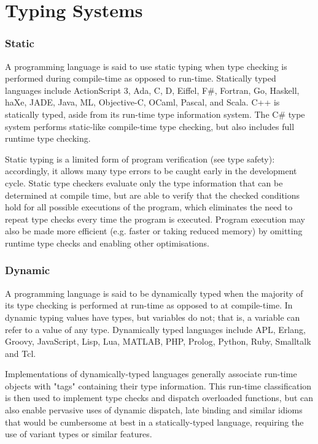 \documentclass[a4paper,oneside]{report}
\begin{document}
	\section{Typing Systems}

		\subsubsection{Static}

		A programming language is said to use static typing when type checking is performed during compile-time as opposed to run-time. Statically typed languages include ActionScript 3, Ada, C, D, Eiffel, F\#, Fortran, Go, Haskell, haXe, JADE, Java, ML, Objective-C, OCaml, Pascal, and Scala. C++ is statically typed, aside from its run-time type information system. The C\# type system performs static-like compile-time type checking, but also includes full runtime type checking. 

		Static typing is a limited form of program verification (see type safety): accordingly, it allows many type errors to be caught early in the development cycle. Static type checkers evaluate only the type information that can be determined at compile time, but are able to verify that the checked conditions hold for all possible executions of the program, which eliminates the need to repeat type checks every time the program is executed. Program execution may also be made more  efficient (e.g. faster or taking reduced memory) by omitting runtime type checks and enabling other optimisations.


		\subsubsection{Dynamic}
		
		A programming language is said to be dynamically typed when the majority of its type checking is performed at run-time as opposed to at compile-time. In dynamic typing values have types, but variables do not; that is, a variable can refer to a value of any type. Dynamically typed languages include APL, Erlang, Groovy, JavaScript, Lisp, Lua, MATLAB, PHP, Prolog, Python, Ruby, Smalltalk and Tcl.

 	 	Implementations of dynamically-typed languages generally associate run-time objects with "tags" containing their type information. This run-time classification is then used to implement type checks and dispatch overloaded functions, but can also enable pervasive uses of dynamic dispatch, late binding and similar idioms that would be cumbersome at best in a statically-typed language, requiring the use of variant types or similar features.
\end{document}

